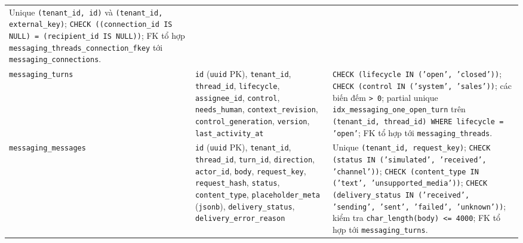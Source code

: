 \begin{table}[htbp]
\begin{tabularx}{\linewidth}{@{}
    >{\raggedright\arraybackslash}p{3.4cm}
    >{\raggedright\arraybackslash}p{5.0cm}
    >{\raggedright\arraybackslash}X@{}}
    Unique \texttt{(tenant\_id, id)} và \texttt{(tenant\_id, external\_key)}; \texttt{CHECK ((connection\_id IS NULL) = (recipient\_id IS NULL))}; FK tổ hợp \texttt{messaging\_\hspace{0pt}threads\_\hspace{0pt}connection\_\hspace{0pt}fkey} tới \texttt{messaging\_\hspace{0pt}connections}. \\
    \texttt{messaging\_\hspace{0pt}turns} &
    \texttt{id} (\texttt{uuid} PK), \texttt{tenant\_id}, \texttt{thread\_id}, \texttt{lifecycle}, \texttt{assignee\_id}, \texttt{control}, \texttt{needs\_human}, \texttt{context\_revision}, \texttt{control\_generation}, \texttt{version}, \texttt{last\_activity\_at} &
    \texttt{CHECK (lifecycle IN ('open', 'closed'))}; \texttt{CHECK (control IN ('system', 'sales'))}; các biến đếm \texttt{> 0}; partial unique \texttt{idx\_\hspace{0pt}messaging\_\hspace{0pt}one\_\hspace{0pt}open\_\hspace{0pt}turn} trên \texttt{(tenant\_id, thread\_id) WHERE lifecycle = 'open'}; FK tổ hợp tới \texttt{messaging\_\hspace{0pt}threads}. \\
    \texttt{messaging\_\hspace{0pt}messages} &
    \texttt{id} (\texttt{uuid} PK), \texttt{tenant\_id}, \texttt{thread\_id}, \texttt{turn\_id}, \texttt{direction}, \texttt{actor\_id}, \texttt{body}, \texttt{request\_key}, \texttt{request\_hash}, \texttt{status}, \texttt{content\_type}, \texttt{placeholder\_meta} (\texttt{jsonb}), \texttt{delivery\_status}, \texttt{delivery\_error\_reason} &
    Unique \texttt{(tenant\_id, request\_key)}; \texttt{CHECK (status IN ('simulated', 'received', 'channel'))}; \texttt{CHECK (content\_type IN ('text', 'unsupported\_media'))}; \texttt{CHECK (delivery\_status IN ('received', 'sending', 'sent', 'failed', 'unknown'))}; kiểm tra \texttt{char\_length(body) <= 4000}; FK tổ hợp tới \texttt{messaging\_\hspace{0pt}turns}. \\
    \bottomrule
  \end{tabularx}
\end{table}

